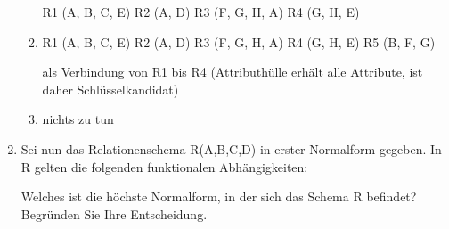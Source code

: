 \documentclass{bschlangaul-aufgabe}
\begin{document}
\begin{enumerate}
\begin{bAntwort}
\begin{enumerate}
R1 (A, B, C, E)
R2 (A, D)
R3 (F, G, H, A)
R4 (G, H, E)

\item {}

R1 (A, B, C, E)
R2 (A, D)
R3 (F, G, H, A)
R4 (G, H, E)
R5 (B, F, G)

als Verbindung von R1 bis R4
(Attributhülle erhält alle Attribute, ist daher Schlüsselkandidat)
\item {}

nichts zu tun
\end{enumerate}
\end{bAntwort}


\item Sei nun das Relationenschema R(A,B,C,D) in erster Normalform
gegeben. In R gelten die folgenden funktionalen Abhängigkeiten:


Welches ist die höchste Normalform, in der sich das Schema R befindet?
Begründen Sie Ihre Entscheidung.

\end{enumerate}
\end{document}
